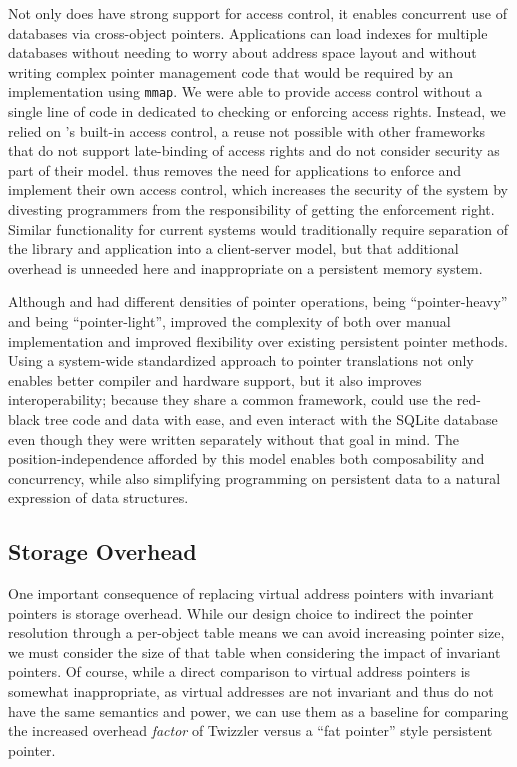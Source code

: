 Not only does \nvkv have strong support for access control, it enables
concurrent use of databases via cross-object pointers. Applications can load indexes
for multiple databases without needing to worry about address space layout and
without writing complex pointer management code that would be required by an
implementation using \texttt{mmap}.
We were able to provide access
control without a single line of code in \nvkv dedicated to checking or enforcing
access rights. Instead, we relied on \Twizzler's built-in access control, a reuse not possible with other
frameworks that do not support late-binding of access rights and do not consider
security as part of their  model. \Twizzler thus removes
the need for applications to enforce and implement their own access control, which
increases the security of the system by divesting programmers from
the responsibility of getting the enforcement right.
Similar functionality for current
systems would traditionally require separation of the library and application
into a client-server model, but that additional overhead is unneeded here and
inappropriate on a persistent memory system.

Although \nvrbt and \nvkv had different densities of pointer operations, \nvrbt being
``pointer-heavy'' and \nvkv being ``pointer-light'', \Twizzler improved the complexity of both
over manual implementation and improved flexibility over existing persistent
pointer methods. Using a system-wide standardized approach to
pointer translations not only enables better compiler and hardware support, but it also improves
interoperability; because they share a common framework, \nvkv could use the red-black tree code and data with ease, and even interact with
the SQLite database even though they were written separately without that goal in mind.
The position-independence afforded by this model
enables both composability and concurrency, while also simplifying programming on persistent data to
a natural expression of data structures.


\subsection{Storage Overhead}

One important consequence of replacing virtual address pointers with invariant pointers is storage
overhead. While our design choice to indirect the pointer resolution through a per-object table
means we can avoid increasing pointer size, we must  consider the size of that table when
considering the impact of invariant pointers. Of course, while a direct comparison to virtual address
pointers is somewhat inappropriate, as virtual addresses are not invariant and thus do not have the
same semantics and power, we can use them as a baseline for comparing the increased overhead
\emph{factor} of Twizzler versus a ``fat pointer'' style persistent pointer.

